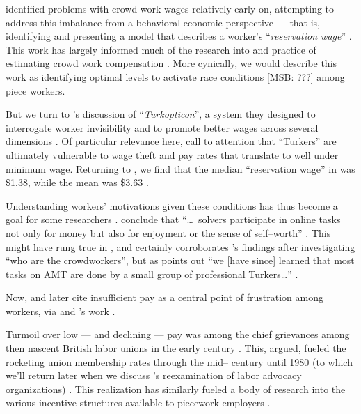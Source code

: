 \documentclass{sigchi}
\newcommand{\msb}[1]{{\color{PineGreen}[MSB: #1]}}
\begin{document}
\citeauthor{laborEconomicsOfCrowdsourcingHorton}
identified problems with crowd work wages relatively early on,
attempting to address this imbalance from a behavioral economic perspective ---
that is, identifying and presenting a model that describes a worker's
``\textit{reservation wage}''
\cite{laborEconomicsOfCrowdsourcingHorton}.
This work has largely informed much of the research into and practice of estimating crowd work compensation
\cite{incentivesShaw,paolacci2010running}.
More cynically,
we would describe this work as identifying optimal levels to activate race conditions \msb{???} among piece workers.

But we turn to \citeauthor{turkopticon}'s discussion of ``\textit{Turkopticon}'',
a system they designed to interrogate worker invisibility and to promote better wages across several dimensions
\cite{turkopticon}.
Of particular relevance here,
\citeauthor{turkopticon} call to attention that ``Turkers'' are ultimately vulnerable to
wage theft and
pay rates that translate to well under minimum wage.
Returning to \citeauthor{laborEconomicsOfCrowdsourcingHorton},
we find that the median ``reservation wage'' in \citeyear{laborEconomicsOfCrowdsourcingHorton}
was \$1.38, while the mean was \$3.63
\cite{laborEconomicsOfCrowdsourcingHorton}.

Understanding workers' motivations given these conditions has thus become a goal for some researchers
\cite{whyWouldAnyoneBrewer}.
\citeauthor{Sun20111033} conclude that
``\dots~solvers participate in online tasks
not only for money
but also for enjoyment
or the sense of self--worth''
\cite{Sun20111033}.
This might have rung true in \citeyear{Sun20111033},
and certainly corroborates \citeauthor{Ross}'s findings after investigating
``who are the crowdworkers'',
but as \citeauthor{whoareNOTtheTurkers} points out
``we [have since] learned that most tasks on AMT are done by a small group of professional Turkers\dots''
\cite{Ross,whoareNOTtheTurkers}.

Now, \citeauthor{turkopticon}
and later
\citeauthor{dynamo} cite insufficient pay as a central point of frustration among workers,
via \citeauthor{irani2015cultural} and \citeauthor{dawnDigitalSweatshopCushing}'s work
\cite{dynamo,irani2015cultural,dawnDigitalSweatshopCushing,turkopticon}.


Turmoil over low --- and declining --- pay was among the chief grievances among then nascent
British labor unions in the early  century
\cite{turner1952trade}.
This, \citeauthor{ebbinghaus1999institutions} argued,
fueled the rocketing union membership rates through the mid-- century until 1980
(to which we'll return later when we discuss \citeauthor{levi2009union}'s reexamination of labor advocacy organizations)
\cite{ebbinghaus1999institutions}.
This realization has similarly fueled a body of research into
the various incentive structures available to piecework employers
\cite{roy1953work}.
\end{document}
